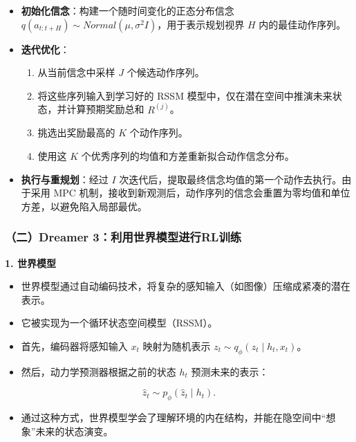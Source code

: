 \begin{itemize}
\tightlist
\item
  \textbf{初始化信念}：构建一个随时间变化的正态分布信念 \(q(a_{t:t+H}) \sim Normal(\mu, \sigma^2 I)\)，用于表示规划视界 \(H\) 内的最佳动作序列。
\item
{}
  \textbf{迭代优化}：

  \begin{enumerate}
  \def\labelenumi{\arabic{enumi}.}
  \tightlist
  \item
    从当前信念中采样 \(J\) 个候选动作序列。
  \item
    将这些序列输入到学习好的 RSSM 模型中，仅在潜在空间中推演未来状态，并计算预期奖励总和 \(R^{(j)}\)。
  \item
    挑选出奖励最高的 \(K\) 个动作序列。
  \item
    使用这 \(K\) 个优秀序列的均值和方差重新拟合动作信念分布。
  \end{enumerate}
\item
  \textbf{执行与重规划}：经过 \(I\) 次迭代后，提取最终信念均值的第一个动作去执行。由于采用 MPC 机制，接收到新观测后，动作序列的信念会重置为零均值和单位方差，以避免陷入局部最优。
\end{itemize}

\hypertarget{ux4e8cdreamer-3ux5229ux7528ux4e16ux754cux6a21ux578bux8fdbux884crlux8badux7ec3}{%
\subsubsection{（二）Dreamer 3：利用世界模型进行RL训练}\label{ux4e8cdreamer-3ux5229ux7528ux4e16ux754cux6a21ux578bux8fdbux884crlux8badux7ec3}}

\textbf{1. 世界模型}

\begin{itemize}
\tightlist
\item
  世界模型通过自动编码技术，将复杂的感知输入（如图像）压缩成紧凑的潜在表示。
\item
  它被实现为一个循环状态空间模型（RSSM）。
\item
  首先，编码器将感知输入 \(x_t\) 映射为随机表示 \(z_t \sim q_{\phi}(z_t \mid h_t, x_t)\)。
\item
{}
  然后，动力学预测器根据之前的状态 \(h_t\) 预测未来的表示：
\end{itemize}

\[
\hat{z}_t \sim p_{\phi}(\hat{z}_t \mid h_t).
\]

\begin{itemize}
\tightlist
\item
  通过这种方式，世界模型学会了理解环境的内在结构，并能在隐空间中``想象''未来的状态演变。
\end{itemize}

